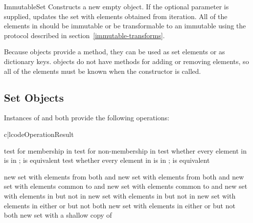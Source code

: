 \begin{classdesc}{ImmutableSet}{}
Constructs a new empty  object.  If the optional
 parameter is supplied, updates the set with elements obtained
from iteration.  All of the elements in  should be immutable or
be transformable to an immutable using the protocol described in
section~\ref{immutable-transforms}.

Because  objects provide a  method,
they can be used as set elements or as dictionary keys.  
objects do not have methods for adding or removing elements, so all of the
elements must be known when the constructor is called.
\end{classdesc}


\subsection{Set Objects}

Instances of  and  both provide
the following operations:

\begin{tableii}{c|l}{code}{Operation}{Result}

  \hline
         {test  for membership in }
         {test  for non-membership in }
         {test whether every element in  is in ;
          is equivalent}
         {test whether every element in  is in ;
          is equivalent}

  \hline
         {new set with elements from both  and }
         {new set with elements from both  and }
         {new set with elements common to  and }
         {new set with elements common to  and }
         {new set with elements in  but not in }
         {new set with elements in  but not in }
         {new set with elements in either  or  but not both}
         {new set with elements in either  or  but not both}
         {new set with a shallow copy of }
\end{tableii}

